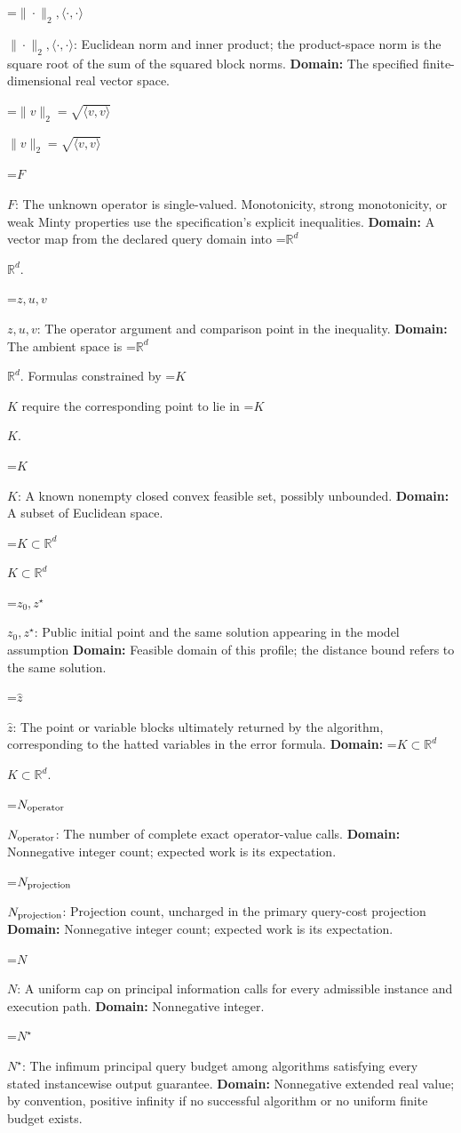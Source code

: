 \documentclass[10pt,a4paper]{article}
\newcommand{\AtlasMath}[1]{\par\begingroup\centering\setbox0=\hbox{$\displaystyle #1$}\ifdim\wd0>1.4\linewidth\typeout{ATLAS WIDE FORMULA: \the\wd0}\fi\ifdim\wd0>\linewidth\resizebox{\linewidth}{!}{\box0}\else\box0\fi\par\endgroup}
\newcommand{\AtlasInlineMath}[1]{\begingroup\setbox0=\hbox{$#1$}\ifdim\wd0>.4\linewidth\endgroup\AtlasMath{#1}\else\endgroup$#1$\fi}
\begin{document}
\AtlasInlineMath{\|\cdot\|_2,\langle\cdot,\cdot\rangle}: Euclidean norm and inner product; the product-space norm is the square root of the sum of the squared block norms. \textbf{Domain:} The specified finite-dimensional real vector space.

\AtlasInlineMath{\|v\|_2=\sqrt{\langle v,v\rangle}}

\AtlasInlineMath{F}: The unknown operator is single-valued. Monotonicity, strong monotonicity, or weak Minty properties use the specification’s explicit inequalities. \textbf{Domain:} A vector map from the declared query domain into \AtlasInlineMath{\mathbb R^d}.

\AtlasInlineMath{z,u,v}: The operator argument and comparison point in the inequality. \textbf{Domain:} The ambient space is \AtlasInlineMath{\mathbb R^d}. Formulas constrained by \AtlasInlineMath{K} require the corresponding point to lie in \AtlasInlineMath{K}.

\AtlasInlineMath{K}: A known nonempty closed convex feasible set, possibly unbounded. \textbf{Domain:} A subset of Euclidean space.

\AtlasInlineMath{K\subset\mathbb R^d}

\AtlasInlineMath{z_0,z^\star}: Public initial point and the same solution appearing in the model assumption \textbf{Domain:} Feasible domain of this profile; the distance bound refers to the same solution.

\AtlasInlineMath{\widehat z}: The point or variable blocks ultimately returned by the algorithm, corresponding to the hatted variables in the error formula. \textbf{Domain:} \AtlasInlineMath{K\subset\mathbb R^d}.

\AtlasInlineMath{N_{\rm operator}}: The number of complete exact operator-value calls. \textbf{Domain:} Nonnegative integer count; expected work is its expectation.

\AtlasInlineMath{N_{\rm projection}}: Projection count, uncharged in the primary query-cost projection \textbf{Domain:} Nonnegative integer count; expected work is its expectation.

\AtlasInlineMath{N}: A uniform cap on principal information calls for every admissible instance and execution path. \textbf{Domain:} Nonnegative integer.

\AtlasInlineMath{N^\star}: The infimum principal query budget among algorithms satisfying every stated instancewise output guarantee. \textbf{Domain:} Nonnegative extended real value; by convention, positive infinity if no successful algorithm or no uniform finite budget exists.
\end{document}
